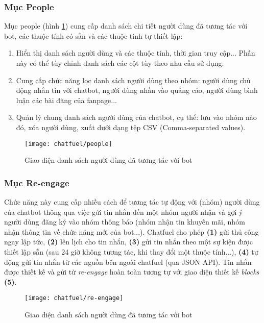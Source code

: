 \subsubsection{Mục People}
Mục people (hình \ref{fig:fig-c3-people}) cung cấp danh sách chi tiết người dùng đã tương tác với bot, các thuộc tính có sẵn và các thuộc tính tự thiết lập:
\begin{enumerate}[label=\textbf{(\arabic*)},align=left,left=0cm..0cm,itemindent=*]
	\item Hiển thị danh sách người dùng và các thuộc tính, thời gian truy cập... Phần này có thể tùy chỉnh danh sách các cột tùy theo nhu cầu sử dụng.
	\item Cung cấp chức năng lọc danh sách người dùng theo nhóm: người dùng chủ động nhắn tin với chatbot, người dùng nhấn vào quảng cáo, người dùng bình luận các bài đăng của fanpage...
	\item Quản lý chung danh sách người dùng của chatbot, cụ thể: lưu vào nhóm nào đó, xóa người dùng, xuất dưới dạng tệp CSV (Comma-separated values).
\end{enumerate}\par

\begin{figure}[htb!]\centering
	\texttt{[image: chatfuel/people]}
	\caption{Giao diện danh sách người dùng đã tương tác với bot}
	\label{fig:fig-c3-people}
\end{figure}\par

\subsubsection{Mục Re-engage}
Chức năng này cung cấp nhiều cách để tương tác tự động với (nhóm) người dùng của chatbot thông qua việc gửi tin nhắn đến một nhóm người nhận và gợi ý người dùng đăng ký vào nhóm thông báo (nhóm nhận tin khuyến mãi, nhóm nhận thông tin về chức năng mới của bot...). Chatfuel cho phép \textbf{(1)} gửi thủ công ngay lập tức, \textbf{(2)} lên lịch cho tin nhắn, \textbf{(3)} gửi tin nhắn theo một sự kiện được thiết lập sẵn (sau 24 giờ không tương tác, khi thay đổi một thuộc tính...), \textbf{(4)} tự động gửi tin nhắn từ các nguồn bên ngoài chatfuel (qua JSON API). Tin nhắn được thiết kế và gửi từ \textit{re-engage} hoàn toàn tương tự với giao diện thiết kế \textit{blocks} \textbf{(5)}.\par

\begin{figure}[htb!]\centering
	\texttt{[image: chatfuel/re-engage]}
	\caption{Giao diện danh sách người dùng đã tương tác với bot}
	\label{fig:fig-c3-re-engage}
\end{figure}\par

